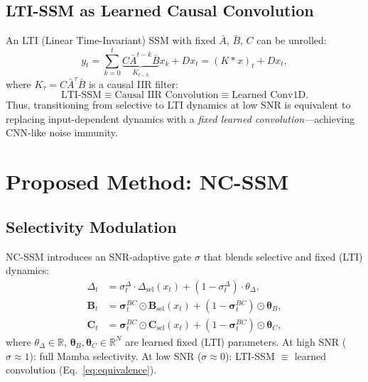 \documentclass{Interspeech}
\begin{document}
\subsection{LTI-SSM as Learned Causal Convolution}
\label{sec:lti}

An LTI (Linear Time-Invariant) SSM with fixed $\bar{A}$, $\bar{B}$, $C$ can be unrolled:
\begin{equation}
y_t = \sum_{k=0}^{t} \underbrace{C \bar{A}^{t-k} \bar{B}}_{K_{t-k}} x_k + D x_t = (K \ast x)_t + D x_t,
\label{eq:conv}
\end{equation}
where $K_\tau = C \bar{A}^\tau \bar{B}$ is a causal IIR filter:
\begin{equation}
\boxed{\text{LTI-SSM} \equiv \text{Causal IIR Convolution} \equiv \text{Learned Conv1D}.}
\label{eq:equivalence}
\end{equation}
Thus, transitioning from selective to LTI dynamics at low SNR is equivalent to replacing input-dependent dynamics with a \emph{fixed learned convolution}---achieving CNN-like noise immunity.

\section{Proposed Method: NC-SSM}
\label{sec:ncssm}

\subsection{Selectivity Modulation}

NC-SSM introduces an SNR-adaptive gate $\sigma$ that blends selective and fixed (LTI) dynamics:
\begin{align}
\Delta_t &= \sigma^\Delta_t \cdot \Delta_{\text{sel}}(x_t) + (1{-}\sigma^\Delta_t) \cdot \theta_\Delta, \label{eq:blend_dt} \\
\mathbf{B}_t &= \bm{\sigma}^{BC}_t \odot \mathbf{B}_{\text{sel}}(x_t) + (1{-}\bm{\sigma}^{BC}_t) \odot \bm{\theta}_B, \label{eq:blend_b} \\
\mathbf{C}_t &= \bm{\sigma}^{BC}_t \odot \mathbf{C}_{\text{sel}}(x_t) + (1{-}\bm{\sigma}^{BC}_t) \odot \bm{\theta}_C, \label{eq:blend_c}
\end{align}
where $\theta_\Delta \in \mathbb{R}$, $\bm{\theta}_B, \bm{\theta}_C \in \mathbb{R}^N$ are learned fixed (LTI) parameters.
At high SNR ($\sigma{\approx}1$): full Mamba selectivity.
At low SNR ($\sigma{\approx}0$): LTI-SSM $\equiv$ learned convolution (Eq.~\ref{eq:equivalence}).
\end{document}
